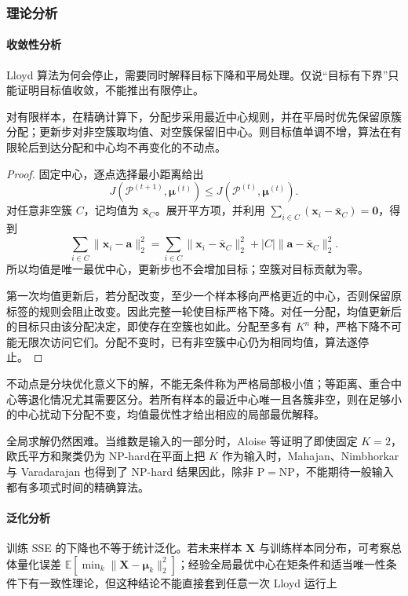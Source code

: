 \subsubsection{理论分析}

\paragraph{收敛性分析}
Lloyd 算法为何会停止，需要同时解释目标下降和平局处理。仅说“目标有下界”只能证明目标值收敛，不能推出有限停止。

\begin{theorem}
  \label{thm:clustering-lloyd}
  对有限样本，在精确计算下，分配步采用最近中心规则，并在平局时优先保留原簇分配；更新步对非空簇取均值、对空簇保留旧中心。则目标值单调不增，算法在有限轮后到达分配和中心均不再变化的不动点。
\end{theorem}
\begin{proof}
固定中心，逐点选择最小距离给出
\[
 J(\mathcal{P}^{(t+1)},\bm{\mu}^{(t)})
 \leq J(\mathcal{P}^{(t)},\bm{\mu}^{(t)}).
\]
对任意非空簇 $C$，记均值为 $\bar{\bm{x}}_C$。展开平方项，并利用 $\sum_{i\in C}(\bm{x}_i-\bar{\bm{x}}_C)=\bm{0}$，得到
\begin{equation}
 \sum_{i\in C}\lVert\bm{x}_i-\bm{a}\rVert_2^2
 =\sum_{i\in C}\lVert\bm{x}_i-\bar{\bm{x}}_C\rVert_2^2
   +|C|\lVert\bm{a}-\bar{\bm{x}}_C\rVert_2^2.
 \label{eq:clustering-mean-decomposition}
\end{equation}
所以均值是唯一最优中心，更新步也不会增加目标；空簇对目标贡献为零。

第一次均值更新后，若分配改变，至少一个样本移向严格更近的中心，否则保留原标签的规则会阻止改变。因此完整一轮使目标严格下降。对任一分配，均值更新后的目标只由该分配决定，即使存在空簇也如此。分配至多有 $K^n$ 种，严格下降不可能无限次访问它们。分配不变时，已有非空簇中心仍为相同均值，算法遂停止。
\end{proof}

不动点是分块优化意义下的解，不能无条件称为严格局部极小值；等距离、重合中心等退化情况尤其需要区分。若所有样本的最近中心唯一且各簇非空，则在足够小的中心扰动下分配不变，均值最优性才给出相应的局部最优解释。

全局求解仍然困难。当维数是输入的一部分时，Aloise 等证明了即使固定 $K=2$，欧氏平方和聚类仍为 NP-hard在平面上把 $K$ 作为输入时，Mahajan、Nimbhorkar 与 Varadarajan 也得到了 NP-hard 结果因此，除非 $\mathrm{P}=\mathrm{NP}$，不能期待一般输入都有多项式时间的精确算法。

\paragraph{泛化分析}
训练 SSE 的下降也不等于统计泛化。若未来样本 $\bm{X}$ 与训练样本同分布，可考察总体量化误差 $\mathbb{E}[\min_k\lVert\bm{X}-\bm{\mu}_k\rVert_2^2]$；经验全局最优中心在矩条件和适当唯一性条件下有一致性理论，但这种结论不能直接套到任意一次 Lloyd 运行上

